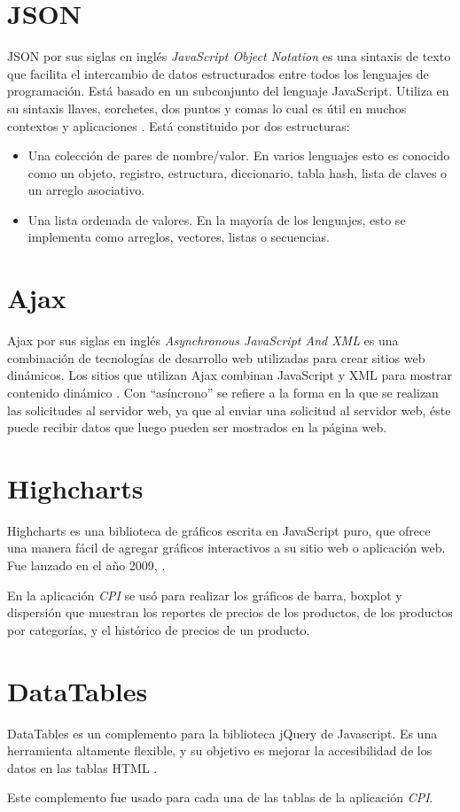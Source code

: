 \section{JSON}
JSON por sus siglas en inglés \textit{JavaScript Object Notation} es una sintaxis de texto que facilita el intercambio de datos estructurados entre todos los lenguajes de programación. Está basado en un subconjunto del lenguaje JavaScript. Utiliza en su sintaxis llaves, corchetes, dos puntos y comas lo cual es útil en muchos contextos y aplicaciones \cite{json}. Está constituido por dos estructuras:

\begin{itemize}
	\item Una colección de pares de nombre/valor. En varios lenguajes esto es conocido como un objeto, registro, estructura, diccionario, tabla hash, lista de claves o un arreglo asociativo.
    \item Una lista ordenada de valores. En la mayoría de los lenguajes, esto se implementa como arreglos, vectores, listas o secuencias.
\end{itemize}

\section{Ajax}
Ajax por sus siglas en inglés \textit{Asynchronous JavaScript And XML} es una combinación de tecnologías de desarrollo web utilizadas para crear sitios web dinámicos. Los sitios que utilizan Ajax combinan JavaScript y XML para mostrar contenido dinámico \cite{ajaxChristensson}. Con “asíncrono” se refiere a la forma en la que se realizan las solicitudes al servidor web, ya que al enviar una solicitud al servidor web, éste puede recibir datos que luego pueden ser mostrados en la página web.

\section{Highcharts}
Highcharts es una biblioteca de gráficos escrita en JavaScript puro, que ofrece una manera fácil de agregar gráficos interactivos a su sitio web o aplicación web. Fue lanzado en el año 2009, \cite{highcharts}. 

En la aplicación \textit{CPI} se usó para realizar los gráficos de barra, boxplot y dispersión que muestran los reportes de precios de los productos, de los productos por categorías, y el histórico de precios de un producto.


\section{DataTables}
DataTables es un complemento para la biblioteca jQuery de Javascript. Es una herramienta altamente flexible, y su objetivo es mejorar la accesibilidad de los datos en las tablas HTML \cite{dataTables}. 

Este complemento fue usado para cada una de las tablas de la aplicación \textit{CPI}.


